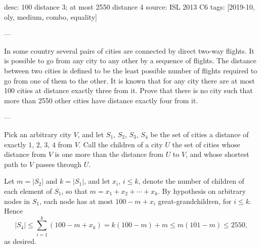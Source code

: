 desc: 100 distance 3; at most 2550 distance 4
source: ISL 2013 C6
tags: [2019-10, oly, medium, combo, equality]

---

In some country several pairs of cities are connected by direct two-way flights. It is possible to go from any city to any other by a sequence of flights. The distance between two cities is defined to be the least possible number of flights required to go from one of them to the other. It is known that for any city there are at most 100 cities at distance exactly three from it. Prove that there is no city such that more than 2550 other cities have distance exactly four from it.

---

Pick an arbitrary city $V$, and let $S_1$, $S_2$, $S_3$, $S_4$ be the set of cities a distance of exactly $1$, $2$, $3$, $4$ from $V$. Call the children of a city $U$ the set of cities whose distance from $V$ is one more than the distance from $U$ to $V$, and whose shortest path to $V$ passes through $U$.

Let $m=|S_2|$ and $k=|S_1|$, and let $x_i$, $i\le k$, denote the number of children of each element of $S_1$, so that $m=x_1+x_2+\cdots+x_k$. By hypothesis on arbitrary nodes in $S_1$, each node has at most $100-m+x_i$ great-grandchildren, for $i\le k$. Hence \[|S_4|\le\sum_{i=1}^k(100-m+x_k)=k(100-m)+m\le m(101-m)\le2550,\]
as desired.
